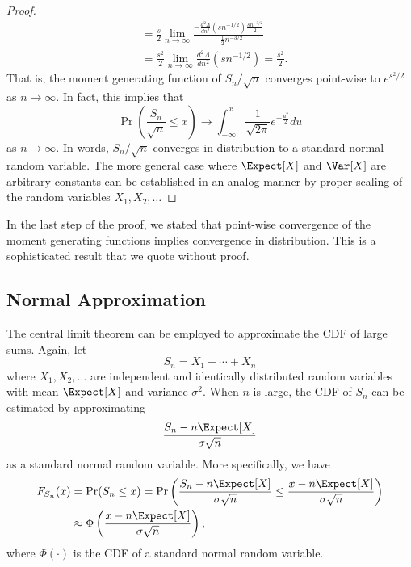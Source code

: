 \begin{proof}
\begin{equation*}
\begin{split}
&= \frac{s}{2} \lim_{n \rightarrow \infty}
\frac{-\frac{d^2 \Lambda}{dn^2} \left( s n^{-1/2} \right) \frac{s n^{-3/2}}{2}}{-\frac{1}{2}n^{-3/2}} \\
&= \frac{s^2}{2} \lim_{n \rightarrow \infty}
\frac{d^2 \Lambda}{dn^2} \left( s n^{-1/2} \right) = \frac{s^2}{2} .
\end{split}
\end{equation*}
That is, the moment generating function of $S_n / \sqrt{n}$ converges point-wise to $e^{s^2/2}$ as $n \rightarrow \infty$.
In fact, this implies that
\begin{equation*}
\Pr \left( \frac{S_n}{\sqrt{n}} \leq x \right) \rightarrow \int_{-\infty}^x \frac{1}{\sqrt{2 \pi}} e^{-\frac{u^2}{2}} du
\end{equation*}
as $n \rightarrow \infty$.
In words, $S_n / \sqrt{n}$ converges in distribution to a standard normal random variable.
The more general case where $\Expect [X]$ and $\Var [X]$ are arbitrary constants can be established in an analog manner by proper scaling of the random variables $X_1, X_2, \ldots$
\end{proof}

In the last step of the proof, we stated that point-wise convergence of the moment generating functions implies convergence in distribution.
This is a sophisticated result that we quote without proof.


\subsection{Normal Approximation}

The central limit theorem can be employed to approximate the CDF of large sums.
Again, let
\begin{equation*}
S_n = X_1 + \cdots + X_n
\end{equation*}
where $X_1, X_2, \ldots$ are independent and identically distributed random variables with mean $\Expect [X]$ and variance $\sigma^2$.
When $n$ is large, the CDF of $S_n$ can be estimated by approximating
\begin{equation*}
\frac{ S_n - n \Expect [X] } { \sigma \sqrt{n} }
\end{equation*}
as a standard normal random variable.
More specifically, we have
\begin{equation*}
\begin{split}
F_{S_n} (x) 
&= \Pr (S_n \leq x)
= \Pr \left( \frac{ S_n - n \Expect [X] }{ \sigma \sqrt{n} }
\leq \frac{x - n \Expect [X]}{\sigma \sqrt{n}} \right) \\
&\approx \Phi \left( \frac{x - n \Expect [X]}{\sigma \sqrt{n}} \right) ,
\end{split}
\end{equation*}
where $\Phi (\cdot)$ is the CDF of a standard normal random variable.


